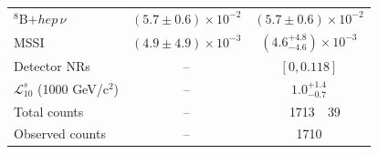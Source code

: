 \begin{table}[th]
\begin{tabular}{l
                r@{$\,\pm\,$}l
                r@{$\,\pm\,$}l}
    $^{8}$B$+hep\,\nu$              & \multicolumn{2}{c}{$(5.7 \pm 0.6) \times 10^{-2}$} & \multicolumn{2}{c}{$(5.7 \pm 0.6) \times 10^{-2}$} \\
    MSSI                            & \multicolumn{2}{c}{$(4.9 \pm 4.9) \times 10^{-3}$} & \multicolumn{2}{c}{$(4.6^{+4.8}_{-4.6}) \times 10^{-3}$}  \\
    Detector NRs                    & \multicolumn{2}{c}{--} & \multicolumn{2}{c}{$[0, 0.118]$} \\%
    $\mathcal{L}_{10}^s$ (1000 GeV/c$^2$)              & \multicolumn{2}{c}{--} & \multicolumn{2}{c}{$1.0^{+1.4}_{-0.7}$} \\
    \hline
    Total counts                    & \multicolumn{2}{c}{--} & 1713 & 39 \\
    \hline
    Observed counts                 & \multicolumn{2}{c}{--} & \multicolumn{2}{c}{1710}$\,\,\,\,\,\,\,\,\,\,\,\,$ \\
    \hline \hline
    \end{tabular}
    \label{tab:backgrounds} 
\end{table}
